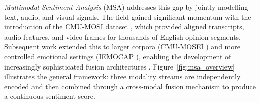 \textit{Multimodal Sentiment Analysis} (MSA) addresses this gap by jointly modelling text, audio, and visual signals. The field gained significant momentum with the introduction of the CMU-MOSI dataset \cite{zadeh2016mosi}, which provided aligned transcripts, audio features, and video frames for thousands of English opinion segments. Subsequent work extended this to larger corpora (CMU-MOSEI \cite{zadeh2018multimodal}) and more controlled emotional settings (IEMOCAP \cite{busso2008iemocap}), enabling the development of increasingly sophisticated fusion architectures \cite{tsai2019multimodal, hazarika2020misa, pham2019found, yang2021mtag}. Figure~\ref{fig:msa_overview} illustrates the general framework: three modality streams are independently encoded and then combined through a cross-modal fusion mechanism to produce a continuous sentiment score.

